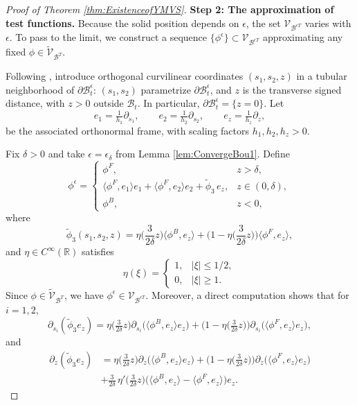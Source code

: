 \documentclass[11pt,twoside,reqno]{amsart}
\numberwithin{equation}{section}
\numberwithin{figure}{section}
\begin{document}
\begin{proof}[Proof of Theorem \ref{thm:ExistenceofYMVS}]
\smallskip
\textbf{Step 2: The approximation of test functions.} 
Because the solid position depends on $\epsilon$, the set $\mathcal{V}_{\mathcal{B}^{\epsilon T}}$ varies with $\epsilon$. To pass to the limit, we construct a sequence $\{\phi^\epsilon\}\subset \mathcal{V}_{\mathcal{B}^{\epsilon T}}$ approximating any fixed $\phi\in \tilde{\mathcal{V}}_{\mathcal{B}^T}$.  

Following \cite[Section 5.2, p.~2055]{gerard2014existence}, introduce orthogonal curvilinear coordinates $(s_1,s_2,z)$ in a tubular neighborhood of $\partial \mathcal{B}^\epsilon_t$: $(s_1,s_2)$ parametrize $\partial \mathcal{B}^\epsilon_t$, and $z$ is the transverse signed distance, with $z>0$ outside $\mathcal{B}_t$. In particular, $\partial \mathcal{B}^\epsilon_t=\{z=0\}$. Let
\[
e_1=\tfrac{1}{h_1}\partial_{s_1},\qquad e_2=\tfrac{1}{h_2}\partial_{s_2},\qquad e_z=\tfrac{1}{h_z}\partial_{z},
\]
be the associated orthonormal frame, with scaling factors $h_1,h_2,h_z>0$.

Fix $\delta>0$ and take $\epsilon=\epsilon_\delta$ from Lemma \ref{lem:ConvergeBou1}. Define 
\begin{equation*}
\phi^\epsilon=\begin{cases}
\phi^F, & z>\delta,\\[2pt]
\langle\phi^F,e_1\rangle e_1+\langle\phi^F,e_2\rangle e_2+\tilde{\phi}_3\,e_z, & z\in(0,\delta),\\[2pt]
\phi^B, & z<0,
\end{cases}
\end{equation*}
where 
\[
\tilde{\phi}_3(s_1,s_2,z)=\eta\!\Big(\frac{3}{2\delta}z\Big)\langle\phi^B,e_z\rangle+\Big(1-\eta\!\Big(\frac{3}{2\delta}z\Big)\Big)\langle\phi^F,e_z\rangle,
\]
and $\eta\in C^\infty(\mathbb{R})$ satisfies
\[
\eta(\xi)=\begin{cases}
1, & |\xi|\le 1/2,\\
0, & |\xi|\ge 1.
\end{cases}
\]
Since $\phi \in \tilde{\mathcal{V}}_{\mathcal{B}^T}$, we have
$\phi^\epsilon \in \mathcal{V}_{\mathcal{B}^{\epsilon T}}$. Moreover, a direct computation shows that for $i=1,2$,
\begin{equation}\label{eq:JK6}
    \partial_{s_i}(\tilde{\phi}_3 e_z)
=\eta\!\Big(\tfrac{3}{2\delta}z\Big)\partial_{s_i}\!\big(\langle\phi^B,e_z\rangle e_z\big)
+\Big(1-\eta\!\Big(\tfrac{3}{2\delta}z\Big)\Big)\partial_{s_i}\!\big(\langle\phi^F,e_z\rangle e_z\big),
\end{equation}
and
\begin{equation}\label{eq:JK5}
    \begin{aligned}
        \partial_{z}(\tilde{\phi}_3 e_z)
&=\eta\!\Big(\tfrac{3}{2\delta}z\Big)\partial_{z}\!\big(\langle\phi^B,e_z\rangle e_z\big)
+\Big(1-\eta\!\Big(\tfrac{3}{2\delta}z\Big)\Big)\partial_{z}\!\big(\langle\phi^F,e_z\rangle e_z\big)
\\&+\frac{3}{2\delta}\,\eta'\!\Big(\tfrac{3}{2\delta}z\Big)\Big(\langle\phi^B,e_z\rangle-\langle\phi^F,e_z\rangle\Big)e_z.
    \end{aligned}
\end{equation}


\end{proof}
\end{document}
